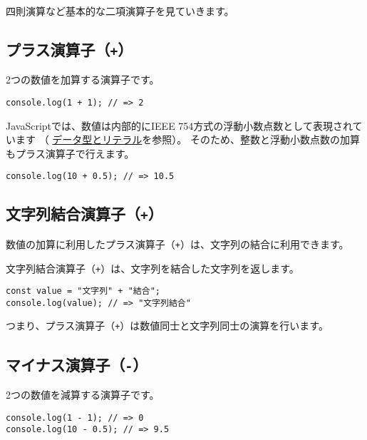 四則演算など基本的な二項演算子を見ていきます。

\hypertarget{plus-operator}{%
\subsection{\texorpdfstring{プラス演算子（\texttt{+}）}{プラス演算子（+）}}\label{plus-operator}}

2つの数値を加算する演算子です。

\begin{lstlisting}
console.log(1 + 1); // => 2
\end{lstlisting}

JavaScriptでは、数値は内部的にIEEE
754方式の浮動小数点数として表現されています （
\hyperlink{data-type-and-literal}{データ型とリテラル}を参照）。
そのため、整数と浮動小数点数の加算もプラス演算子で行えます。

\begin{lstlisting}
console.log(10 + 0.5); // => 10.5
\end{lstlisting}

\hypertarget{string-combination-operator}{%
\subsection{\texorpdfstring{文字列結合演算子（\texttt{+}）}{文字列結合演算子（+）}}\label{string-combination-operator}}

数値の加算に利用したプラス演算子（\texttt{+}）は、文字列の結合に利用できます。

文字列結合演算子（\texttt{+}）は、文字列を結合した文字列を返します。

\begin{lstlisting}
const value = "文字列" + "結合";
console.log(value); // => "文字列結合"
\end{lstlisting}

つまり、プラス演算子（\texttt{+}）は数値同士と文字列同士の演算を行います。

\hypertarget{minus-operator}{%
\subsection{\texorpdfstring{マイナス演算子（\texttt{-}）}{マイナス演算子（-）}}\label{minus-operator}}

2つの数値を減算する演算子です。

\begin{lstlisting}
console.log(1 - 1); // => 0
console.log(10 - 0.5); // => 9.5
\end{lstlisting}

